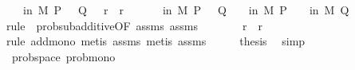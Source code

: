\begin{isabellebody}
\ \ \ {\isachardoublequoteopen}{\isasymP}{\isacharparenleft}{\kern0pt}{\isasymomega}\ in\ M{\isachardot}{\kern0pt}\ P\ {\isasymomega}\ {\isasymor}\ Q\ {\isasymomega}{\isacharparenright}{\kern0pt}\ {\isasymle}\ r{}\ {\isacharplus}{\kern0pt}\ r{}{\isachardoublequoteclose}\isanewline
%
\isadelimproof
%
\endisadelimproof
%
\isatagproof
{}\isamarkupfalse%
\ {\isacharminus}{\kern0pt}\isanewline
\ \ \isamarkupfalse%
\ {\isachardoublequoteopen}{\isasymP}{\isacharparenleft}{\kern0pt}{\isasymomega}\ in\ M{\isachardot}{\kern0pt}\ P\ {\isasymomega}\ {\isasymor}\ Q\ {\isasymomega}{\isacharparenright}{\kern0pt}\ {\isasymle}\ {\isasymP}{\isacharparenleft}{\kern0pt}{\isasymomega}\ in\ M{\isachardot}{\kern0pt}\ P\ {\isasymomega}{\isacharparenright}{\kern0pt}\ {\isacharplus}{\kern0pt}\ {\isasymP}{\isacharparenleft}{\kern0pt}{\isasymomega}\ in\ M{\isachardot}{\kern0pt}\ Q\ {\isasymomega}{\isacharparenright}{\kern0pt}{\isachardoublequoteclose}\isanewline
\ \ \ \ \isamarkupfalse%
\ {\isacharparenleft}{\kern0pt}rule\ \ prob{\isacharunderscore}{\kern0pt}sub{\isacharunderscore}{\kern0pt}additive{\isacharbrackleft}{\kern0pt}OF\ assms{\isacharparenleft}{\kern0pt}{}{\isacharparenright}{\kern0pt}\ assms{\isacharparenleft}{\kern0pt}{}{\isacharparenright}{\kern0pt}{\isacharbrackright}{\kern0pt}{\isacharparenright}{\kern0pt}\isanewline
\ \ \isamarkupfalse%
\ \isamarkupfalse%
\ {\isachardoublequoteopen}{\isachardot}{\kern0pt}{\isachardot}{\kern0pt}{\isachardot}{\kern0pt}\ {\isasymle}\ r{}\ {\isacharplus}{\kern0pt}\ r{}{\isachardoublequoteclose}\isanewline
\ \ \ \ \isamarkupfalse%
\ {\isacharparenleft}{\kern0pt}rule\ add{\isacharunderscore}{\kern0pt}mono{\isacharcomma}{\kern0pt}\ metis\ assms{\isacharparenleft}{\kern0pt}{}{\isacharparenright}{\kern0pt}{\isacharcomma}{\kern0pt}\ metis\ assms{\isacharparenleft}{\kern0pt}{}{\isacharparenright}{\kern0pt}{\isacharparenright}{\kern0pt}\isanewline
\ \ \isamarkupfalse%
\ \isamarkupfalse%
\ {\isacharquery}{\kern0pt}thesis\ \isamarkupfalse%
\ simp\isanewline
{}\isamarkupfalse%
%
\endisatagproof
{\isafoldproof}%
%
\isadelimproof
\isanewline
%
\endisadelimproof
\isanewline
{}\isamarkupfalse%
\ {\isacharparenleft}{\kern0pt}\ prob{\isacharunderscore}{\kern0pt}space{\isacharparenright}{\kern0pt}\ prob{\isacharunderscore}{\kern0pt}mono{\isacharcolon}{\kern0pt}\isanewline

\end{isabellebody}
